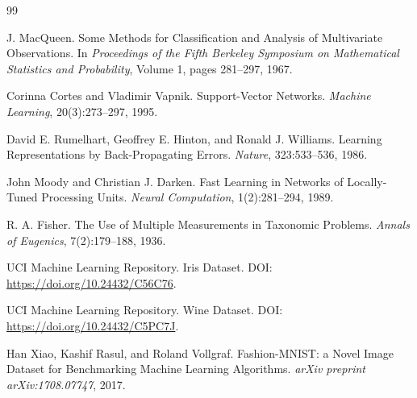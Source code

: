 \documentclass[UTF8]{ctexart}
\begin{document}
\begin{thebibliography}{99}

J. MacQueen.
\newblock Some Methods for Classification and Analysis of Multivariate Observations.
\newblock In \emph{Proceedings of the Fifth Berkeley Symposium on Mathematical Statistics and Probability}, Volume 1, pages 281--297, 1967.

Corinna Cortes and Vladimir Vapnik.
\newblock Support-Vector Networks.
\newblock \emph{Machine Learning}, 20(3):273--297, 1995.

David E. Rumelhart, Geoffrey E. Hinton, and Ronald J. Williams.
\newblock Learning Representations by Back-Propagating Errors.
\newblock \emph{Nature}, 323:533--536, 1986.

John Moody and Christian J. Darken.
\newblock Fast Learning in Networks of Locally-Tuned Processing Units.
\newblock \emph{Neural Computation}, 1(2):281--294, 1989.

R. A. Fisher.
\newblock The Use of Multiple Measurements in Taxonomic Problems.
\newblock \emph{Annals of Eugenics}, 7(2):179--188, 1936.

UCI Machine Learning Repository.
\newblock Iris Dataset.
\newblock DOI: \url{https://doi.org/10.24432/C56C76}.

UCI Machine Learning Repository.
\newblock Wine Dataset.
\newblock DOI: \url{https://doi.org/10.24432/C5PC7J}.

Han Xiao, Kashif Rasul, and Roland Vollgraf.
\newblock Fashion-MNIST: a Novel Image Dataset for Benchmarking Machine Learning Algorithms.
\newblock \emph{arXiv preprint arXiv:1708.07747}, 2017.

\end{thebibliography}
\end{document}
